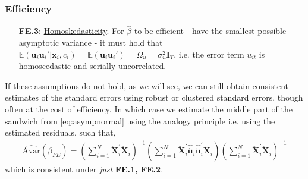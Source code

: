 \subsubsection*{Efficiency}

\begin{itemize}
    \item [\textbf{FE.3}:] \underline{Homoskedasticity}. For $\hat{\beta}$ to be efficient - have the smallest possible asymptotic variance - it must hold that $\mathbb{E}(\bm{u}_i \bm{u}_i' | \bm{x}_i, c_i) = \mathbb{E}(\bm{u}_i \bm{u}_i') = \Omega_{u} = \sigma^2_u \bm{I}_T$, i.e. the error term $u_{it}$ is homoscedastic and serially uncorrelated.    
\end{itemize}
If these assumptions do not hold, as we will see, we can still obtain consistent estimates of the standard errors using robust or clustered standard errors, though often at the cost of efficiency. In which case we estimate the middle part of the sandwich from \eqref{eq:asympnormal} using the analogy principle i.e. using the estimated residuals, such that, 
\begin{align*}
    \hat{\text{Avar}}(\hat{\beta}_{FE}) = \left( \sum_{i=1}^N \bm{\ddot{X}}_i^\prime \bm{\ddot{X}}_i \right)^{-1} \left( \sum_{i=1}^N \bm{\ddot{X}}_i^\prime \hat{\ddot{\bm{u}}}_i \hat{\ddot{\bm{u}}}_i^\prime \bm{\ddot{X}}_i \right) \left( \sum_{i=1}^N \bm{\ddot{X}}_i^\prime \bm{\ddot{X}}_i \right)^{-1}
\end{align*} 
which is consistent under \textit{just} \textbf{FE.1, FE.2}. 